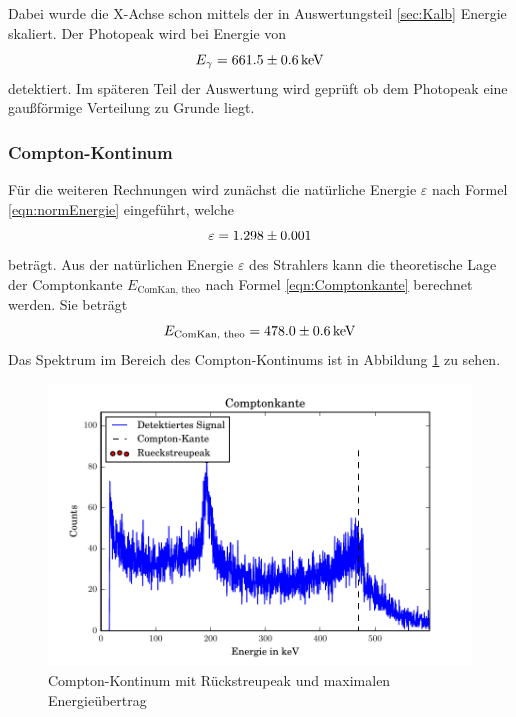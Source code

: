 Dabei wurde die X-Achse schon mittels der in Auswertungsteil \ref{sec:Kalb} Energie skaliert. Der Photopeak wird bei Energie von
\begin{equation}
  E_\gamma = \num{661.5 +- 0.6} \, \text{keV}
  \label{eqn:CsPhoto}
\end{equation}
detektiert. Im späteren Teil der Auswertung wird geprüft ob dem Photopeak eine gaußförmige Verteilung zu Grunde liegt.


\subsubsection{Compton-Kontinum}
Für die weiteren Rechnungen wird zunächst die natürliche Energie $\varepsilon$ nach Formel \ref{eqn:normEnergie} eingeführt, welche
\begin{equation}
\varepsilon = \num{1.298 +- 0.001}
  \label{eqn:nE}
\end{equation}
beträgt. Aus der natürlichen Energie $\varepsilon$ des Strahlers kann die theoretische Lage der Comptonkante $E_\text{ComKan, theo}$ nach Formel \ref{eqn:Comptonkante} berechnet werden. Sie beträgt
\begin{equation}
  E_\text{ComKan, theo} = \num{478 +- 0.6} \, \text{keV}
  \label{eqn:KanTheo}
\end{equation}
Das Spektrum im Bereich des Compton-Kontinums ist in Abbildung \ref{fig:Compt} zu sehen.

\begin{figure}[htpb]
  \centering
  \includegraphics[width=\textwidth]{./build/Compton.pdf}
  \caption{Compton-Kontinum mit Rückstreupeak und maximalen Energieübertrag}
  \label{fig:Compt}
\end{figure}

